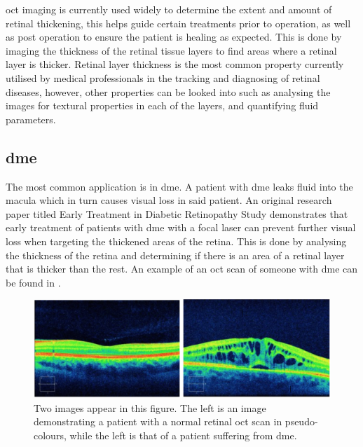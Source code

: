 \Gls{oct} imaging is currently used widely to determine the extent and amount of
retinal thickening, this helps guide certain treatments prior to operation, as well
as post operation to ensure the patient is healing as expected. This is done by
imaging the thickness of the retinal tissue layers to find areas where a retinal
layer is thicker. Retinal layer thickness is the most common property currently
utilised by medical professionals in the tracking and diagnosing of retinal
diseases, however, other properties can be looked into such as analysing
the images for textural properties in each of the layers, and quantifying fluid parameters. \cite{mbib_4}

\subsection{\Gls{dme}}
The most common application is in \Gls{dme}. A patient with \Gls{dme} leaks
fluid into the macula which in turn causes visual loss in said patient.  An
original research paper titled Early Treatment in Diabetic Retinopathy
Study demonstrates that early treatment of patients with \Gls{dme} with a
focal laser can prevent further visual loss when targeting the thickened
areas of the retina. \cite{mbib_4}  This is done by analysing the thickness
of the retina and determining if there is an area of a retinal layer that is thicker
than the rest. An example of an \Gls{oct} scan of someone with \Gls{dme} can
be found in .

\begin{figure}[H]
\centering
\includegraphics{figures/morgan_5}
\caption{Two images appear in this figure. The left is an image demonstrating
a patient with a normal retinal \Gls{oct} scan in pseudo-colours, while the left
is that of a patient suffering from \Gls{dme}. \cite{mbib_10} }
\label{fig:m_5}
\end{figure}


